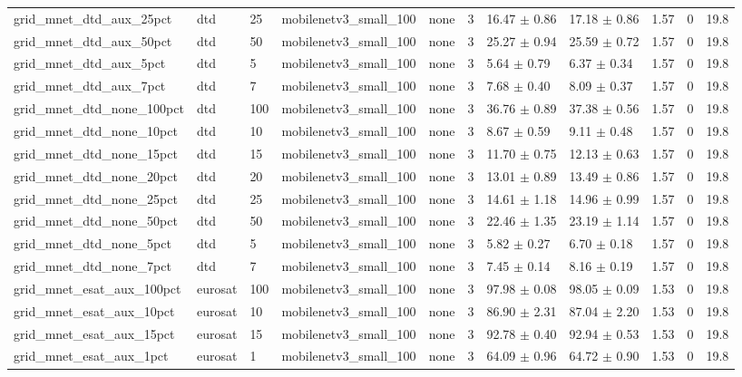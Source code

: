 \begin{tabular}{lllllllllll}
grid_mnet_dtd_aux_25pct & dtd & 25 & mobilenetv3_small_100 & none & 3 & 16.47 $\pm$ 0.86 & 17.18 $\pm$ 0.86 & 1.57 & 0 & 19.8 \\
grid_mnet_dtd_aux_50pct & dtd & 50 & mobilenetv3_small_100 & none & 3 & 25.27 $\pm$ 0.94 & 25.59 $\pm$ 0.72 & 1.57 & 0 & 19.8 \\
grid_mnet_dtd_aux_5pct & dtd & 5 & mobilenetv3_small_100 & none & 3 & 5.64 $\pm$ 0.79 & 6.37 $\pm$ 0.34 & 1.57 & 0 & 19.8 \\
grid_mnet_dtd_aux_7pct & dtd & 7 & mobilenetv3_small_100 & none & 3 & 7.68 $\pm$ 0.40 & 8.09 $\pm$ 0.37 & 1.57 & 0 & 19.8 \\
grid_mnet_dtd_none_100pct & dtd & 100 & mobilenetv3_small_100 & none & 3 & 36.76 $\pm$ 0.89 & 37.38 $\pm$ 0.56 & 1.57 & 0 & 19.8 \\
grid_mnet_dtd_none_10pct & dtd & 10 & mobilenetv3_small_100 & none & 3 & 8.67 $\pm$ 0.59 & 9.11 $\pm$ 0.48 & 1.57 & 0 & 19.8 \\
grid_mnet_dtd_none_15pct & dtd & 15 & mobilenetv3_small_100 & none & 3 & 11.70 $\pm$ 0.75 & 12.13 $\pm$ 0.63 & 1.57 & 0 & 19.8 \\
grid_mnet_dtd_none_20pct & dtd & 20 & mobilenetv3_small_100 & none & 3 & 13.01 $\pm$ 0.89 & 13.49 $\pm$ 0.86 & 1.57 & 0 & 19.8 \\
grid_mnet_dtd_none_25pct & dtd & 25 & mobilenetv3_small_100 & none & 3 & 14.61 $\pm$ 1.18 & 14.96 $\pm$ 0.99 & 1.57 & 0 & 19.8 \\
grid_mnet_dtd_none_50pct & dtd & 50 & mobilenetv3_small_100 & none & 3 & 22.46 $\pm$ 1.35 & 23.19 $\pm$ 1.14 & 1.57 & 0 & 19.8 \\
grid_mnet_dtd_none_5pct & dtd & 5 & mobilenetv3_small_100 & none & 3 & 5.82 $\pm$ 0.27 & 6.70 $\pm$ 0.18 & 1.57 & 0 & 19.8 \\
grid_mnet_dtd_none_7pct & dtd & 7 & mobilenetv3_small_100 & none & 3 & 7.45 $\pm$ 0.14 & 8.16 $\pm$ 0.19 & 1.57 & 0 & 19.8 \\
grid_mnet_esat_aux_100pct & eurosat & 100 & mobilenetv3_small_100 & none & 3 & 97.98 $\pm$ 0.08 & 98.05 $\pm$ 0.09 & 1.53 & 0 & 19.8 \\
grid_mnet_esat_aux_10pct & eurosat & 10 & mobilenetv3_small_100 & none & 3 & 86.90 $\pm$ 2.31 & 87.04 $\pm$ 2.20 & 1.53 & 0 & 19.8 \\
grid_mnet_esat_aux_15pct & eurosat & 15 & mobilenetv3_small_100 & none & 3 & 92.78 $\pm$ 0.40 & 92.94 $\pm$ 0.53 & 1.53 & 0 & 19.8 \\
grid_mnet_esat_aux_1pct & eurosat & 1 & mobilenetv3_small_100 & none & 3 & 64.09 $\pm$ 0.96 & 64.72 $\pm$ 0.90 & 1.53 & 0 & 19.8 \\

\end{tabular}
